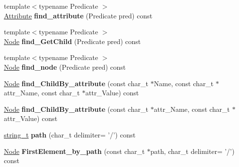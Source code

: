 \begin{DoxyCompactItemize}
\item 
\hypertarget{classphys_1_1xml_1_1Node_a59e43a51c83065e02fea2f39a37d84f0}{
{\footnotesize template$<$typename Predicate $>$ }\\\hyperlink{classphys_1_1xml_1_1Attribute}{Attribute} {\bfseries find\_\-attribute} (Predicate pred) const }
\label{d7/d0a/classphys_1_1xml_1_1Node_a59e43a51c83065e02fea2f39a37d84f0}

\item 
\hypertarget{classphys_1_1xml_1_1Node_a79407ab20c32081ab8498d84a5e36208}{
{\footnotesize template$<$typename Predicate $>$ }\\\hyperlink{classphys_1_1xml_1_1Node}{Node} {\bfseries find\_\-GetChild} (Predicate pred) const }
\label{d7/d0a/classphys_1_1xml_1_1Node_a79407ab20c32081ab8498d84a5e36208}

\item 
\hypertarget{classphys_1_1xml_1_1Node_af755f4925f6839e0f8a768cfc3b265d4}{
{\footnotesize template$<$typename Predicate $>$ }\\\hyperlink{classphys_1_1xml_1_1Node}{Node} {\bfseries find\_\-node} (Predicate pred) const }
\label{d7/d0a/classphys_1_1xml_1_1Node_af755f4925f6839e0f8a768cfc3b265d4}

\item 
\hypertarget{classphys_1_1xml_1_1Node_adc60f80478377f22f8db5f0e34ab5360}{
\hyperlink{classphys_1_1xml_1_1Node}{Node} {\bfseries find\_\-ChildBy\_\-attribute} (const char\_\-t $\ast$Name, const char\_\-t $\ast$attr\_\-Name, const char\_\-t $\ast$attr\_\-Value) const }
\label{d7/d0a/classphys_1_1xml_1_1Node_adc60f80478377f22f8db5f0e34ab5360}

\item 
\hypertarget{classphys_1_1xml_1_1Node_a06cb5ad007dfe72456016b8bd8e6b4d0}{
\hyperlink{classphys_1_1xml_1_1Node}{Node} {\bfseries find\_\-ChildBy\_\-attribute} (const char\_\-t $\ast$attr\_\-Name, const char\_\-t $\ast$attr\_\-Value) const }
\label{d7/d0a/classphys_1_1xml_1_1Node_a06cb5ad007dfe72456016b8bd8e6b4d0}

\item 
\hypertarget{classphys_1_1xml_1_1Node_a74b9f51a6642808510e71f643cc861ad}{
\hyperlink{namespacephys_1_1xml_a6db751f2b35502e04c123bb70daa0d20}{string\_\-t} {\bfseries path} (char\_\-t delimiter= '/') const }
\label{d7/d0a/classphys_1_1xml_1_1Node_a74b9f51a6642808510e71f643cc861ad}

\item 
\hypertarget{classphys_1_1xml_1_1Node_ad53eb05b9c0c2ac9388f5207c38ca98e}{
\hyperlink{classphys_1_1xml_1_1Node}{Node} {\bfseries FirstElement\_\-by\_\-path} (const char\_\-t $\ast$path, char\_\-t delimiter= '/') const }
\label{d7/d0a/classphys_1_1xml_1_1Node_ad53eb05b9c0c2ac9388f5207c38ca98e}


\end{DoxyCompactItemize}
